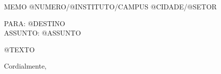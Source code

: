 


\hspace{1.4cm}


\noindent MEMO @NUMERO/@INSTITUTO/CAMPUS \uppercase{@CIDADE}/@SETOR



\noindent PARA:  @DESTINO \\
\noindent ASSUNTO: @ASSUNTO

\onehalfspacing @TEXTO

\noindent Cordialmente,



